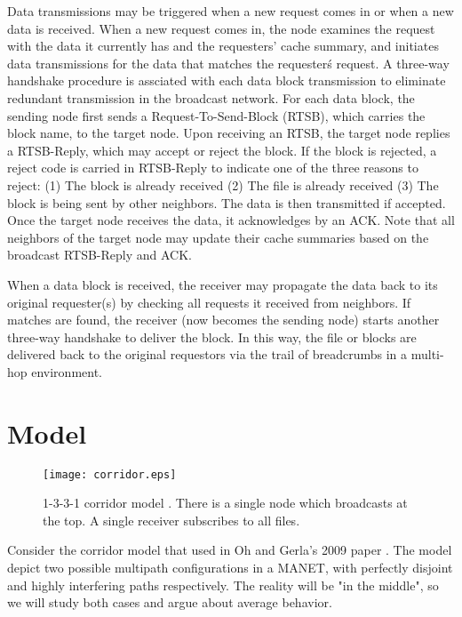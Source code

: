 Data transmissions may be triggered when a new request comes in or when a new data is received. When a new request comes in, the node examines the request with the data it currently has and the requesters' cache summary, and initiates data transmissions for the data that matches the requester\'s request. A three-way handshake procedure is assciated with each data block transmission to eliminate redundant transmission in the broadcast network. For each data block, the sending node first sends a Request-To-Send-Block (RTSB), which carries the block name, to the target node. Upon receiving an RTSB, the target node replies a RTSB-Reply, which may accept or reject the block. If the block is rejected, a reject code is carried in RTSB-Reply to indicate one of the three reasons to reject: (1) The block is already received (2) The file is already received (3) The block is being sent by other neighbors. The data is then transmitted if accepted. Once the target node receives the data, it acknowledges by an ACK. Note that all neighbors of the target node may update their cache summaries based on the broadcast RTSB-Reply and ACK. 

When a data block is received, the receiver may propagate the data back to its original requester(s) by checking all requests it received from neighbors. If matches are found, the receiver (now becomes the sending node) starts another three-way handshake to deliver the block. In this way, the file or blocks are delivered back to the original requestors via the trail of breadcrumbs in a multi-hop environment. 

\section{Model}

\begin{figure}[t]
\centering
\texttt{[image: corridor.eps]}
\caption{1-3-3-1 corridor model \cite{Oh:2009:RMR:1702135.1702167}. There is a single node which broadcasts at the top. A single receiver subscribes to all files.}
\label{fig:static}
\end{figure}

	 	 	
Consider the corridor model that used in Oh and Gerla's 2009 paper \cite{Oh:2009:RMR:1702135.1702167}. The model depict two possible multipath configurations in a MANET, with perfectly disjoint and highly interfering paths respectively. The reality will be "in the middle", so we will study both cases and argue about average behavior.

